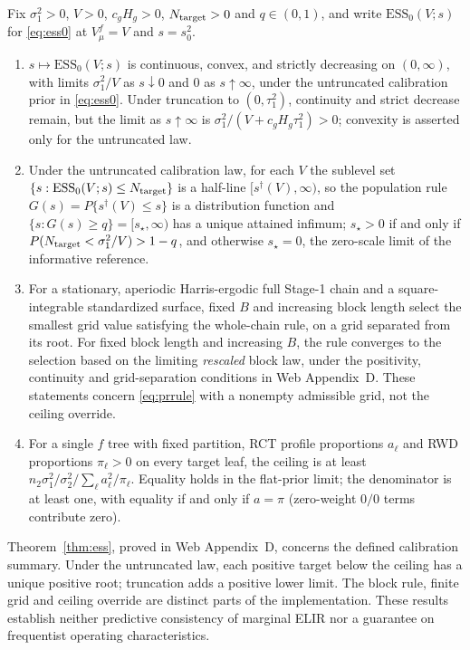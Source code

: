 \begin{theorem}\label{thm:ess}
Fix $\sigma_1^2>0$, $V>0$, $c_gH_g>0$, $N_{\rm target}>0$ and $q\in(0,1)$, and write $\mathrm{ESS}_0(V;s)$ for \eqref{eq:ess0} at $V_\mu^f=V$ and $s=s_0^2$.
\begin{enumerate}[label=(\alph*),leftmargin=2.2em]
\item $s\mapsto\mathrm{ESS}_0(V;s)$ is continuous, convex, and strictly decreasing on $(0,\infty)$, with limits $\sigma_1^2/V$ as $s\downarrow0$ and $0$ as $s\uparrow\infty$, under the untruncated calibration prior in \eqref{eq:ess0}. Under truncation to $(0,\tau_1^2)$, continuity and strict decrease remain, but the limit as $s\uparrow\infty$ is $\sigma_1^2/(V+c_gH_g\tau_1^2)>0$; convexity is asserted only for the untruncated law.
\item Under the untruncated calibration law, for each $V$ the sublevel set $\{s:\mathrm{ESS}_0(V;s)\le N_{\rm target}\}$ is a half-line $[s^\dagger(V),\infty)$, so the population rule $G(s)=P\{s^\dagger(V)\le s\}$ is a distribution function and $\{s:G(s)\ge q\}=[s_\star,\infty)$ has a unique attained infimum; $s_\star>0$ if and only if $P(N_{\rm target}<\sigma_1^2/V)>1-q$, and otherwise $s_\star=0$, the zero-scale limit of the informative reference.
\item For a stationary, aperiodic Harris-ergodic full Stage-1 chain and a square-integrable standardized surface, fixed $B$ and increasing block length select the smallest grid value satisfying the whole-chain rule, on a grid separated from its root. For fixed block length and increasing $B$, the rule converges to the selection based on the limiting \emph{rescaled} block law, under the positivity, continuity and grid-separation conditions in Web Appendix~D. These statements concern \eqref{eq:prrule} with a nonempty admissible grid, not the ceiling override.
\item For a single $f$ tree with fixed partition, RCT profile proportions $a_\ell$ and RWD proportions $\pi_\ell>0$ on every target leaf, the ceiling is at least $n_2\sigma_1^2/\sigma_2^2\big/\sum_\ell a_\ell^2/\pi_\ell$. Equality holds in the flat-prior limit; the denominator is at least one, with equality if and only if $a=\pi$ (zero-weight $0/0$ terms contribute zero).
\end{enumerate}
\end{theorem}

Theorem~\ref{thm:ess}, proved in Web Appendix~D, concerns the defined calibration summary. Under the untruncated law, each positive target below the ceiling has a unique positive root; truncation adds a positive lower limit. The block rule, finite grid and ceiling override are distinct parts of the implementation. These results establish neither predictive consistency of marginal ELIR nor a guarantee on frequentist operating characteristics.

